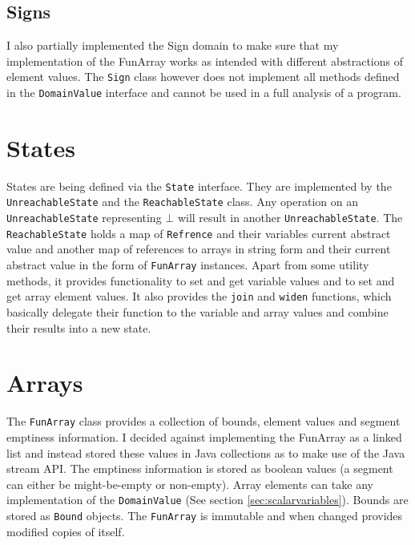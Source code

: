 

\subsection{Signs}
I also partially implemented the Sign domain to make sure that my implementation of the FunArray works as intended with different abstractions of element values. The \texttt{Sign} class however does not implement all methods defined in the \texttt{DomainValue} interface and cannot be used in a full analysis of a program.






\section{States}

States are being defined via the \texttt{State} interface. They are implemented by the \texttt{UnreachableState} and the \texttt{ReachableState} class. Any operation on an \texttt{UnreachableState} representing $\bot$ will result in another \texttt{Unreachable\allowbreak State}. The \texttt{ReachableState} holds a map of \texttt{Refrence} and their variables current abstract value and another map of references to arrays in string form and their current abstract value in the form of \texttt{FunArray} instances. Apart from some utility methods, it provides functionality to set and get variable values and to set and get array element values. It also provides the \texttt{join} and \texttt{widen} functions, which basically delegate their function to the variable and array values and combine their results into a new state. 








\section{Arrays}

The \texttt{FunArray} class provides a collection of bounds, element values and segment emptiness information. I decided against implementing the FunArray as a linked list and instead stored these values in Java collections as to make use of the Java stream API. The emptiness information is stored as boolean values (a segment can either be might-be-empty or non-empty). Array elements can take any implementation of the \texttt{DomainValue} (See section \ref{sec:scalarvariables}). Bounds are stored as \texttt{Bound} objects. The \texttt{FunArray} is immutable and when changed provides modified copies of itself.

